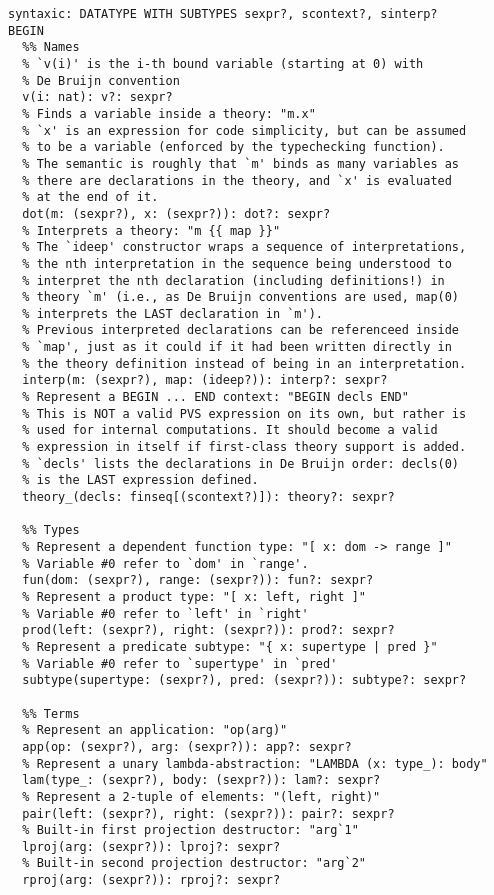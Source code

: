 \documentclass[utf8,a4paper]{article}
\begin{document}
\begin{verbatim}
syntaxic: DATATYPE WITH SUBTYPES sexpr?, scontext?, sinterp?
BEGIN
  %% Names
  % `v(i)' is the i-th bound variable (starting at 0) with
  % De Bruijn convention
  v(i: nat): v?: sexpr?
  % Finds a variable inside a theory: "m.x"
  % `x' is an expression for code simplicity, but can be assumed
  % to be a variable (enforced by the typechecking function).
  % The semantic is roughly that `m' binds as many variables as
  % there are declarations in the theory, and `x' is evaluated
  % at the end of it.
  dot(m: (sexpr?), x: (sexpr?)): dot?: sexpr?
  % Interprets a theory: "m {{ map }}"
  % The `ideep' constructor wraps a sequence of interpretations,
  % the nth interpretation in the sequence being understood to
  % interpret the nth declaration (including definitions!) in
  % theory `m' (i.e., as De Bruijn conventions are used, map(0)
  % interprets the LAST declaration in `m').
  % Previous interpreted declarations can be referenceed inside
  % `map', just as it could if it had been written directly in
  % the theory definition instead of being in an interpretation.
  interp(m: (sexpr?), map: (ideep?)): interp?: sexpr?
  % Represent a BEGIN ... END context: "BEGIN decls END"
  % This is NOT a valid PVS expression on its own, but rather is
  % used for internal computations. It should become a valid
  % expression in itself if first-class theory support is added.
  % `decls' lists the declarations in De Bruijn order: decls(0)
  % is the LAST expression defined.
  theory_(decls: finseq[(scontext?)]): theory?: sexpr?

  %% Types
  % Represent a dependent function type: "[ x: dom -> range ]"
  % Variable #0 refer to `dom' in `range'.
  fun(dom: (sexpr?), range: (sexpr?)): fun?: sexpr?
  % Represent a product type: "[ x: left, right ]"
  % Variable #0 refer to `left' in `right'
  prod(left: (sexpr?), right: (sexpr?)): prod?: sexpr?
  % Represent a predicate subtype: "{ x: supertype | pred }"
  % Variable #0 refer to `supertype' in `pred'
  subtype(supertype: (sexpr?), pred: (sexpr?)): subtype?: sexpr?

  %% Terms
  % Represent an application: "op(arg)"
  app(op: (sexpr?), arg: (sexpr?)): app?: sexpr?
  % Represent a unary lambda-abstraction: "LAMBDA (x: type_): body"
  lam(type_: (sexpr?), body: (sexpr?)): lam?: sexpr?
  % Represent a 2-tuple of elements: "(left, right)"
  pair(left: (sexpr?), right: (sexpr?)): pair?: sexpr?
  % Built-in first projection destructor: "arg`1"
  lproj(arg: (sexpr?)): lproj?: sexpr?
  % Built-in second projection destructor: "arg`2"
  rproj(arg: (sexpr?)): rproj?: sexpr?


\end{verbatim}
\end{document}
